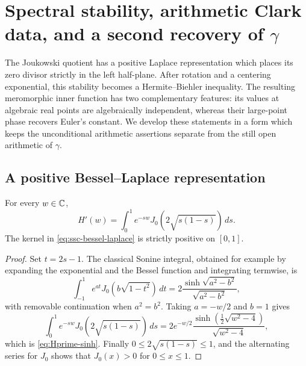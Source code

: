 \providecommand{\Eexp}{\mathcal E_{\mathrm{exp}}}

\section{Spectral stability, arithmetic Clark data, and a second
recovery of \texorpdfstring{$\gamma$}{gamma}}
\label{sec:ssc-spectral-stability-clark}

The Joukowski quotient has a positive Laplace representation which places
its zero divisor strictly in the left half-plane.  After rotation and a
centering exponential, this stability becomes a Hermite--Biehler
inequality.  The resulting meromorphic inner function has two complementary
features: its values at algebraic real points are algebraically independent,
whereas their large-point phase recovers Euler's constant.  We develop these
statements in a form which keeps the unconditional arithmetic assertions
separate from the still open arithmetic of \(\gamma\).

\subsection{A positive Bessel--Laplace representation}

\begin{proposition}
\label{prop:ssc-bessel-laplace}
For every \(w\in\mathbb C\),
\begin{equation}\label{eq:ssc-bessel-laplace}
 H'(w)=\int_0^1 e^{-sw}
 J_0\!\left(2\sqrt{s(1-s)}\right)\,ds.
\end{equation}
The kernel in \eqref{eq:ssc-bessel-laplace} is strictly positive on
\([0,1]\).
\end{proposition}

\begin{proof}
Set \(t=2s-1\).  The classical Sonine integral, obtained for example by
expanding the exponential and the Bessel function and integrating
termwise, is
\[
 \int_{-1}^{1}e^{at}J_0\!\left(b\sqrt{1-t^2}\right)\,dt
 =2\frac{\sinh\sqrt{a^2-b^2}}{\sqrt{a^2-b^2}},
\]
with removable continuation when \(a^2=b^2\).  Taking
\(a=-w/2\) and \(b=1\) gives
\[
 \int_0^1 e^{-sw}J_0\!\left(2\sqrt{s(1-s)}\right)\,ds
 =2e^{-w/2}
   \frac{\sinh(\frac12\sqrt{w^2-4})}{\sqrt{w^2-4}},
\]
which is \eqref{eq:Hprime-sinh}.  Finally
\(0\leq2\sqrt{s(1-s)}\leq1\), and the alternating series for \(J_0\)
shows that \(J_0(x)>0\) for \(0\leq x\leq1\).
\end{proof}

